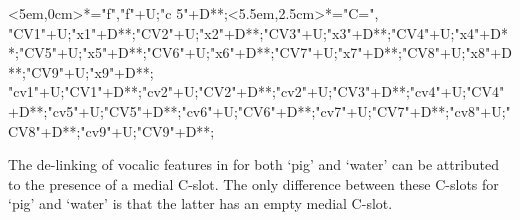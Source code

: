 \begin{multicols}{2}
\begin{exe}
{\begin{xlist}
{				<5em,0cm>*\as{\tsc{[+fr.]}}="f","f"+U;"c 5"+D**\dir{-};<5.5em,2.5cm>*\as{=}="C=",
				"CV1"+U;"x1"+D**\dir{-};"CV2"+U;"x2"+D**\dir{-};"CV3"+U;"x3"+D**\dir{-};"CV4"+U;"x4"+D**\dir{-};"CV5"+U;"x5"+D**\dir{-};"CV6"+U;"x6"+D**\dir{-};"CV7"+U;"x7"+D**\dir{-};"CV8"+U;"x8"+D**\dir{-};"CV9"+U;"x9"+D**\dir{-};
				"cv1"+U;"CV1"+D**\dir{-};"cv2"+U;"CV2"+D**\dir{-};"cv2"+U;"CV3"+D**\dir{-};"cv4"+U;"CV4"+D**\dir{-};"cv5"+U;"CV5"+D**\dir{-};"cv6"+U;"CV6"+D**\dir{-};"cv7"+U;"CV7"+D**\dir{};"cv8"+U;"CV8"+D**\dir{-};"cv9"+U;"CV9"+D**\dir{};
			\endxy}
		\end{xlist}}
	\end{exe}
\end{multicols}

The de-linking of vocalic features in 
for both  `pig' and  `water' can be attributed to the presence of a medial C-slot.
The only difference between these C-slots for  `pig'
and  `water' is that the latter has an empty medial C-slot.
